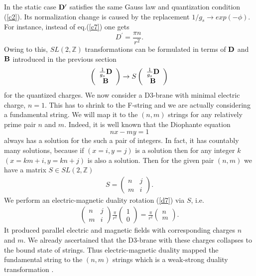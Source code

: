 \documentclass[a4paper,12pt]{article}
\begin{document}
In the static case ${{\bf D}}^{\prime}$ satisfies the same Gauss law and 
quantization condition (\ref{c2}). Its normalization change is caused by
the replacement $1/g_s\rightarrow exp(-\phi)$. For instance, 
instead of eq.(\ref{c7}) one gets
\begin{equation}
D^{\prime}=\frac{\pi n}{r^2}.
\label{d6}
\end{equation}
Owing to this, $SL(2,\mathbb{Z})$ transformations can be formulated in 
terms of ${\bf D}$ and ${\bf B}$ introduced in the previous section
\begin{eqnarray}
\left(\begin{array}{c}
\frac{1}{g_s}{\bf D}\\
{\bf B}
\end{array}\right)
\rightarrow S
\left(\begin{array}{c}
\frac{1}{g_s}{\bf D}\\
{\bf B}
\end{array}\right)
\label{d7}
\end{eqnarray}
 for the quantized charges.  
We now consider a D3-brane with minimal electric charge, $n=1$. This has to 
shrink to the F-string and we are actually considering a fundamental string.
We will map it to the $(n,m)$ strings for any relatively prime pair
$n$ and $m$. Indeed, it is well known that the Diophante equation
\begin{equation}
nx-my=1
\label{d8}
\end{equation}
always has a solution for the such a pair of integers. In fact, it has  
countably many solutions, because if $(x=i,y=j)$ is a solution then for any 
integer $k$ $(x=km+i,y=kn+j)$ is also a solution. Then for the given pair  
$(n,m)$ we have a matrix $S\in SL(2,\mathbb{Z})$
\begin{eqnarray}
S=
\left(\begin{array}{cc}
n & j\\
m & i
\end{array}\right).
\label{d9}
\end{eqnarray}
We perform an electric-magnetic duality rotation (\ref{d7}) via $S$, i.e.
\begin{eqnarray}
\left(\begin{array}{cc}
n & j\\
m & i
\end{array}\right)
\frac{\pi}{r^2}
\left(\begin{array}{c}
1\\
0
\end{array}\right)
=\frac{\pi }{r^2}
\left(\begin{array}{c}
n\\
m
\end{array}\right).
\label{d10}
\end{eqnarray}
It produced parallel electric and magnetic fields with corresponding charges 
$n$ and $m$. We already ascertained that the D3-brane with these charges 
collapses to the bound state of strings. Thus electric-magnetic duality 
mapped the fundamental string to the $(n,m)$ strings which is a 
weak-strong duality transformation \cite{17}.
\end{document}
